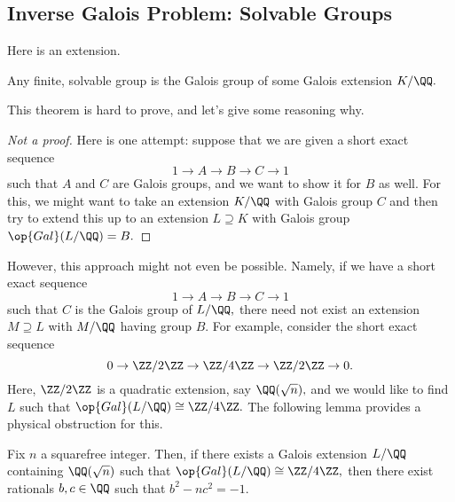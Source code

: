 \documentclass[../notes.tex]{subfiles}
\begin{document}
\subsection{Inverse Galois Problem: Solvable Groups}
Here is an extension.
\begin{theorem}[Shafarevich]
	Any finite, solvable group is the Galois group of some Galois extension $K/\QQ.$
\end{theorem}
This theorem is hard to prove, and let's give some reasoning why.
\begin{proof}[Not a proof]
	Here is one attempt: suppose that we are given a short exact sequence
	\[1\to A\to B\to C\to 1\]
	such that $A$ and $C$ are Galois groups, and we want to show it for $B$ as well. For this, we might want to take an extension $K/\QQ$ with Galois group $C$ and then try to extend this up to an extension $L\supseteq K$ with Galois group $\op{Gal}(L/\QQ)=B.$
\end{proof}
However, this approach might not even be possible. Namely, if we have a short exact sequence
\[1\to A\to B\to C\to 1\]
such that $C$ is the Galois group of $L/\QQ,$ there need not exist an extension $M\supseteq L$ with $M/\QQ$ having group $B.$ For example, consider the short exact sequence
\[0\to\ZZ/2\ZZ\to\ZZ/4\ZZ\to\ZZ/2\ZZ\to0.\]
Here, $\ZZ/2\ZZ$ is a quadratic extension, say $\QQ(\sqrt n),$ and we would like to find $L$ such that $\op{Gal}(L/\QQ)\cong\ZZ/4\ZZ.$ The following lemma provides a physical obstruction for this.
\begin{lemma}
	Fix $n$ a squarefree integer. Then, if there exists a Galois extension $L/\QQ$ containing $\QQ(\sqrt n)$ such that $\op{Gal}(L/\QQ)\cong\ZZ/4\ZZ,$ then there exist rationals $b,c\in\QQ$ such that $b^2-nc^2=-1.$
\end{lemma}
\end{document}
